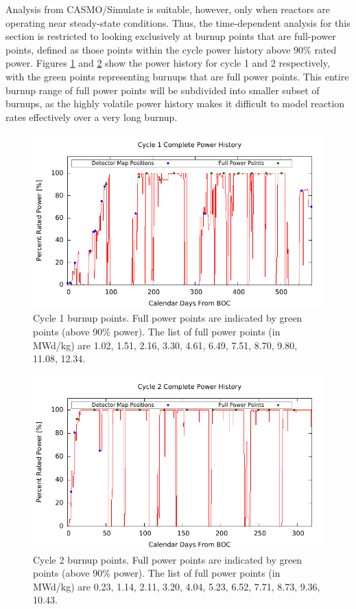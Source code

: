 \documentclass{article}
\begin{document}
Analysis from CASMO/Simulate is suitable, however, only when reactors are operating near steady-state conditions. Thus, the time-dependent analysis for this section is restricted to looking exclusively at burnup points that are full-power points, defined as those points within the cycle power history above 90\% rated power. Figures \ref{fig:cyc1powerhist} and \ref{fig:cyc2powerhist} show the power history for cycle 1 and 2 respectively, with the green points representing burnups that are full power points. This entire burnup range of full power points will be subdivided into smaller subset of burnups, as the highly volatile power history makes it difficult to model reaction rates effectively over a very long burnup.

\begin{figure}[!htb]
\centering
\includegraphics[width = 4.5 in]{figures/cycle1powerhist}
\caption{Cycle 1 burnup points. Full power points are indicated by green points (above 90\% power). The list of full power points (in MWd/kg) are 1.02, 1.51, 2.16, 3.30, 4.61, 6.49, 7.51, 8.70, 9.80, 11.08, 12.34.}
\label{fig:cyc1powerhist}
\end{figure}

\begin{figure}[!htb]
\centering
\includegraphics[width = 4.5 in]{figures/cycle2powerhist}
\caption{Cycle 2 burnup points. Full power points are indicated by green points (above 90\% power). The list of full power points (in MWd/kg) are 0.23, 1.14, 2.11, 3.20, 4.04, 5.23, 6.52, 7.71, 8.73, 9.36, 10.43.}
\label{fig:cyc2powerhist}
\end{figure}
\end{document}
